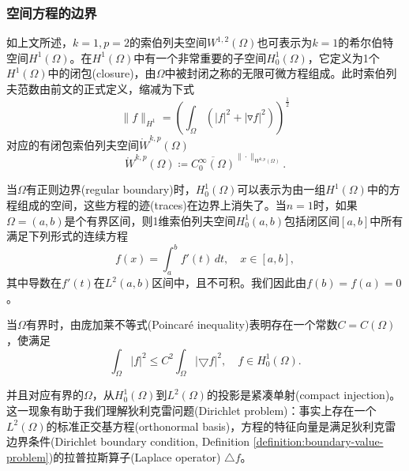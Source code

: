 \subsubsection{空间方程的边界}
如上文所述，$k=1,p=2$的索伯列夫空间$W^{1,2}(\Omega)$也可表示为$k=1$的希尔伯特空间$H^1(\Omega)$。在$H^1(\Omega)$中有一个非常重要的子空间$H_0^1 (\Omega)$，它定义为1个$H^1(\Omega)$中的闭包(closure)，由$\Omega$中被封闭之称的无限可微方程组成。此时索伯列夫范数由前文的正式定义，缩减为下式
\begin{equation*}
  \Big\| f \Big\|_{H^1} = \left(
  \int_{\Omega}
  \left(
  \left| f \right|^2 + | \triangledown f |^2
  \right)
  \right)^{\frac{1}{2}}
\end{equation*}
对应的有闭包索伯列夫空间$\mathring{W}^{k,p}(\Omega)$
\begin{equation}
  \label{eq:sobolev-space-closure-def}
  \mathring{W}^{k,p}(\Omega) \coloneqq \overline{C^{\infty}_0 (\Omega)}^{
  \| \cdot \|_{W^{k,p}(\Omega)}
  }.
\end{equation}


当$\Omega$有正则边界(regular boundary)时，$H_0^1 (\Omega)$可以表示为由一组$H^1(\Omega)$中的方程组成的空间，这些方程的迹(traces)在边界上消失了。当$n=1$时，如果$\Omega=(a,b)$是个有界区间，则1维索伯列夫空间$H_0^1(a,b)$包括闭区间$[a,b]$中所有满足下列形式的连续方程
\begin{equation*}
  f(x) = \int_a^b f'(t) \, dt, \quad x \in [a,b],
\end{equation*}
其中导数在$ f'(t)$在$L^2(a,b)$区间中，且不可积。我们因此由$f(b)=f(a)=0$。

当$\Omega$有界时，由庞加莱不等式(Poincaré inequality)表明存在一个常数$C = C(\Omega)$，使满足
\begin{equation*}
  \int_{\Omega} \left| f \right|^2 \le C^2 \int_{\Omega} \left| \bigtriangledown f \right|^2, \quad f \in H_{0}^1(\Omega).
\end{equation*}

并且对应有界的$\Omega$，从$H_0^1 (\Omega)$到$L^2(\Omega)$的投影是紧凑单射(compact injection)。这一现象有助于我们理解狄利克雷问题(Dirichlet problem)：事实上存在一个$L^2(\Omega)$的标准正交基方程(orthonormal basis)，方程的特征向量是满足狄利克雷边界条件(Dirichlet boundary condition, Definition \ref{definition:boundary-value-problem})的拉普拉斯算子(Laplace operator) $\bigtriangleup f$。

